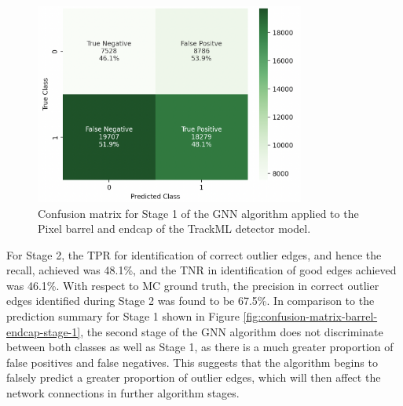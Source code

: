 \begin{figure}[htbp]
    \centering
    \includegraphics[width=0.79\textwidth]{images/7-results/confusion_matrix_barrel_stage_2.png}
    \caption{Confusion matrix for Stage 1 of the GNN algorithm applied to the Pixel barrel and endcap of the TrackML detector model.}
    \label{fig:confusion-matrix-barrel-endcap-stage-2}%
\end{figure}

For Stage 2, the TPR for identification of correct outlier edges, and hence the recall, achieved was 48.1\%, and the TNR in identification of good edges achieved was 46.1\%. With respect to MC ground truth, the precision in correct outlier edges identified during Stage 2 was found to be 67.5\%. In comparison to the prediction summary for Stage 1 shown in Figure \ref{fig:confusion-matrix-barrel-endcap-stage-1}, the second stage of the GNN algorithm does not discriminate between both classes as well as Stage 1, as there is a much greater proportion of false positives and false negatives. This suggests that the algorithm begins to falsely predict a greater proportion of outlier edges, which will then affect the network connections in further algorithm stages.








